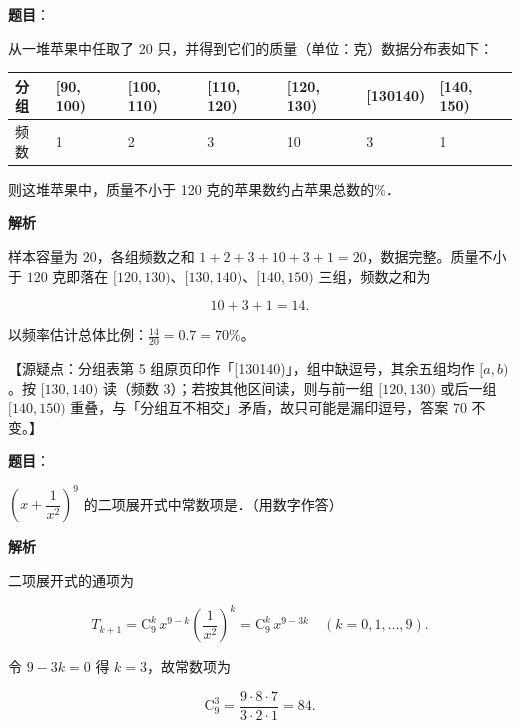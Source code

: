 \begin{answer}

\textbf{题目}：

从一堆苹果中任取了 20 只，并得到它们的质量（单位：克）数据分布表如下：

\begin{center}
\begin{tabular}{lllllll}
\toprule
分组 & [90, 100) & [100, 110) & [110, 120) & [120, 130) & [130140) & [140, 150) \\
\midrule
频数 & 1 & 2 & 3 & 10 & 3 & 1 \\
\bottomrule
\end{tabular}
\end{center}

则这堆苹果中，质量不小于 120 克的苹果数约占苹果总数的\gkblank{}\%．

\textbf{解析}

样本容量为 $20$，各组频数之和 $1+2+3+10+3+1=20$，数据完整。质量不小于 $120$ 克即落在 $[120,130)$、$[130,140)$、$[140,150)$ 三组，频数之和为

\nopagebreak[4]
\[10+3+1=14 .\]

以频率估计总体比例：$\frac{14}{20}=0.7=70\%$。

【源疑点：分组表第 5 组原页印作「[130140)」，组中缺逗号，其余五组均作 $[a,b)$。按 $[130,140)$ 读（频数 3）；若按其他区间读，则与前一组 $[120,130)$ 或后一组 $[140,150)$ 重叠，与「分组互不相交」矛盾，故只可能是漏印逗号，答案 $70$ 不变。】


\end{answer}
\begin{answer}

\textbf{题目}：

$\left(x+\dfrac{1}{x^2}\right)^9$ 的二项展开式中常数项是\gkblank{}．（用数字作答）

\textbf{解析}

二项展开式的通项为

\nopagebreak[4]
\[T_{k+1}=\mathrm C_9^k\,x^{9-k}\left(\frac1{x^2}\right)^{k}=\mathrm C_9^k\,x^{9-3k}\quad(k=0,1,\dots,9).\]

令 $9-3k=0$ 得 $k=3$，故常数项为

\nopagebreak[4]
\[\mathrm C_9^3=\frac{9\cdot8\cdot7}{3\cdot2\cdot1}=84 .\]


\end{answer}
